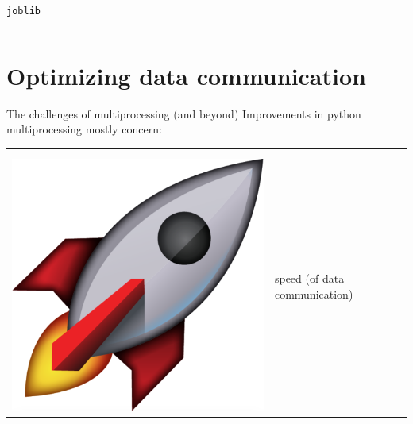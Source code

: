 \documentclass[13pt, usenames,dvipsnames]{beamer} %
\newcommand{\mycode}[2][\tiny] {\texttt{#2}}
\begin{document}
\begin{frame}[fragile]{\mycode[\small]{joblib}}
{\begin{tabular}{m{0.5cm} m{10cm}}
        \end{tabular}
        }

    \end{frame}

\section{Optimizing data communication}
    \begin{frame}[t]{The challenges of multiprocessing (and beyond)}
        \vspace{1cm}
        Improvements in python multiprocessing mostly concern:
        \hspace{10em}
        \begin{tabular}{m{0.5cm} m{10cm}}
                 & \\
                 & \\
                \includegraphics[width=\linewidth] {media/rocket-emoji.png} & speed (of data communication) \\

\end{tabular}
\end{frame}
\end{document}

